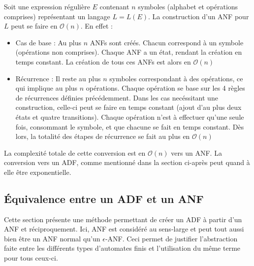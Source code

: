 \begin{complexity}
	Soit une expression régulière $E$ contenant $n$ symboles (alphabet et opérations comprises) représentant un langage $L=L(E)$.
  La construction d'un ANF pour $L$ peut se faire en $\mathcal{O}(n)$. En effet :
	\begin{itemize}
		\item Cas de base : Au plus $n$ ANFs sont créés. Chacun correspond à un symbole (opérations non comprises). Chaque ANF a un état, rendant la création en temps constant. La création de tous ces ANFs est alors en $\mathcal{O}(n)$
		\item Récurrence : Il reste au plus $n$ symboles correspondant à des opérations, ce qui implique au plus $n$ opérations. Chaque opération se base sur les 4 règles de récurrences définies précédemment. Dans les cas necéssitant une construction, celle-ci peut se faire en temps constant (ajout d'au plus deux états et quatre transitions). Chaque opération n'est à effectuer qu'une seule fois, consommant le symbole, et que chacune se fait en temps constant. Dès lors, la totalité des étapes de récurrence se fait au plus en $\mathcal{O}(n)$
	\end{itemize}

	La complexité totale de cette conversion est en $\mathcal{O}(n)$ vers un ANF. La conversion vers un ADF, comme mentionné dans la section ci-après peut quand à elle être exponentielle.

\end{complexity}




\subsection{Équivalence entre un ADF et un ANF}\label{adf:anfadf}
Cette section présente une méthode permettant de créer un ADF à partir d'un ANF et réciproquement. Ici, ANF est considéré au sens-large et peut tout aussi bien être un ANF normal qu'un $\epsilon$-ANF. Ceci permet de justifier l'abstraction faite entre les différents types d'automates finis et l'utilisation du même terme pour tous ceux-ci.

